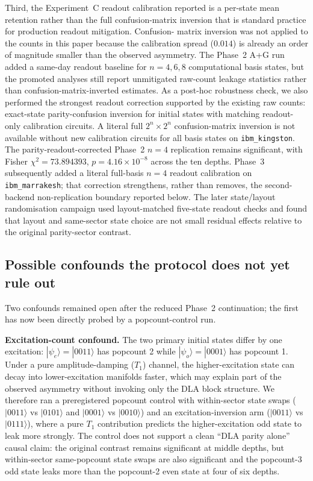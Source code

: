 \documentclass[reprint,aps,physrev,superscriptaddress,floatfix,longbibliography]{revtex4-2}
\begin{document}
Third, the Experiment~C readout calibration reported is a per-state
mean retention rather than the full confusion-matrix inversion that
is standard practice for production readout mitigation. Confusion-
matrix inversion was not applied to the counts in this paper because
the calibration spread ($0.014$) is already an order of magnitude
smaller than the observed asymmetry. The Phase~2 A+G run added a
same-day readout baseline for $n=4,6,8$ computational basis states,
but the promoted analyses still report unmitigated raw-count leakage
statistics rather than confusion-matrix-inverted estimates. As a
post-hoc robustness check, we also performed the strongest readout
correction supported by the existing raw counts: exact-state
parity-confusion inversion for initial states with matching
readout-only calibration circuits. A literal full $2^n\times2^n$
confusion-matrix inversion is not available without new calibration
circuits for all basis states on \texttt{ibm\_kingston}. The
parity-readout-corrected Phase~2 $n=4$ replication remains significant, with Fisher
$\chi^2=73.894393$, $p=4.16\times10^{-8}$ across the ten depths.
Phase~3 subsequently added a literal full-basis $n=4$ readout
calibration on \texttt{ibm\_marrakesh}; that correction strengthens,
rather than removes, the second-backend non-replication boundary
reported below. The later state/layout randomisation campaign used
layout-matched five-state readout checks and found that layout and
same-sector state choice are not small residual effects relative to
the original parity-sector contrast.

\subsection{Possible confounds the protocol does not yet rule out}

Two confounds remained open after the reduced Phase~2 continuation;
the first has now been directly probed by a popcount-control run.

\textbf{Excitation-count confound.} The two primary initial states
differ by one excitation: $|\psi_e\rangle = |0011\rangle$ has
popcount 2 while $|\psi_o\rangle = |0001\rangle$ has popcount 1.
Under a pure amplitude-damping ($T_1$) channel, the higher-excitation
state can decay into lower-excitation manifolds faster, which may
explain part of the observed asymmetry without invoking only the DLA
block structure. We therefore ran a preregistered popcount control
with within-sector state swaps
($|0011\rangle$ vs $|0101\rangle$ and
$|0001\rangle$ vs $|0010\rangle$) and an excitation-inversion arm
($|0011\rangle$ vs $|0111\rangle$), where a pure $T_1$ contribution
predicts the higher-excitation odd state to leak more strongly. The
control does not support a clean ``DLA parity alone'' causal claim:
the original contrast remains significant at middle depths, but
within-sector same-popcount state swaps are also significant and the
popcount-3 odd state leaks more than the popcount-2 even state at
four of six depths.
\end{document}

